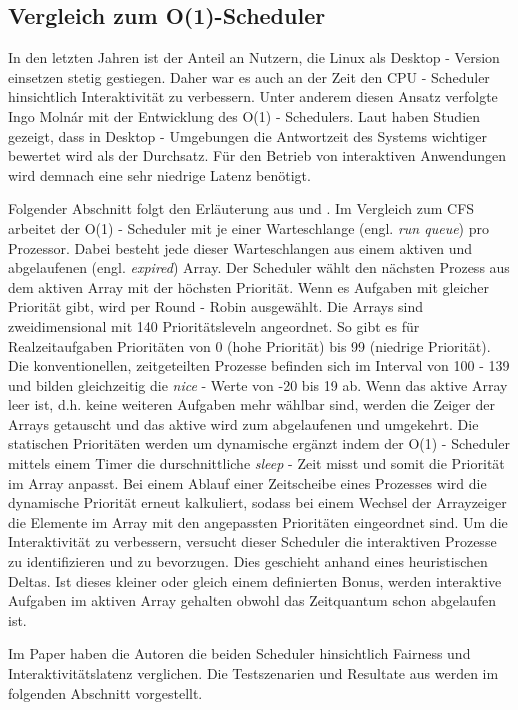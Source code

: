 \subsection{Vergleich zum O(1)-Scheduler}\label{s:compO1}
In den letzten Jahren ist der Anteil an Nutzern, die Linux als Desktop - Version einsetzen stetig gestiegen. Daher war es auch an der Zeit den CPU - Scheduler hinsichtlich Interaktivität zu verbessern. Unter anderem diesen Ansatz verfolgte Ingo Molnár mit der Entwicklung des O(1) - Schedulers. Laut \cite{papercomparison} haben Studien gezeigt, dass in Desktop - Umgebungen die Antwortzeit des Systems wichtiger bewertet wird als der Durchsatz. Für den Betrieb von interaktiven Anwendungen wird demnach eine sehr niedrige Latenz benötigt. 

Folgender Abschnitt folgt den Erläuterung aus \cite{asilberschatz} und \cite{papercomparison}.
Im Vergleich zum CFS arbeitet der O(1) - Scheduler mit je einer Warteschlange (engl. \textit{run queue}) pro Prozessor. Dabei besteht jede dieser Warteschlangen aus einem aktiven und abgelaufenen (engl. \textit{expired}) Array. Der Scheduler wählt den nächsten Prozess aus dem aktiven Array mit der höchsten Priorität. Wenn es Aufgaben mit gleicher Priorität gibt, wird per Round - Robin ausgewählt. Die Arrays sind zweidimensional mit 140 Prioritätsleveln angeordnet. So gibt es für Realzeitaufgaben Prioritäten von 0 (hohe Priorität) bis 99 (niedrige Priorität). Die konventionellen, zeitgeteilten Prozesse befinden sich im Interval von 100 - 139 und bilden gleichzeitig die \textit{nice} - Werte von -20 bis 19 ab. Wenn das aktive Array leer ist, d.h. keine weiteren Aufgaben mehr wählbar sind, werden die Zeiger der Arrays getauscht und das aktive wird zum abgelaufenen und umgekehrt. Die statischen Prioritäten werden um dynamische ergänzt indem der O(1) - Scheduler mittels einem Timer die durschnittliche \textit{sleep} - Zeit misst und somit die Priorität im Array anpasst. Bei einem Ablauf einer Zeitscheibe eines Prozesses wird die dynamische Priorität erneut kalkuliert, sodass bei einem Wechsel der Arrayzeiger die Elemente im Array mit den angepassten Prioritäten eingeordnet sind. Um die Interaktivität zu verbessern, versucht dieser Scheduler die interaktiven Prozesse zu identifizieren und zu bevorzugen. Dies geschieht anhand eines heuristischen Deltas. Ist dieses kleiner oder gleich einem definierten Bonus, werden interaktive Aufgaben im aktiven Array gehalten obwohl das Zeitquantum schon abgelaufen ist.

Im Paper \cite{papercomparison} haben die Autoren die beiden Scheduler hinsichtlich Fairness und Interaktivitätslatenz verglichen. Die Testszenarien und  Resultate aus \cite{papercomparison} werden im folgenden Abschnitt vorgestellt.

